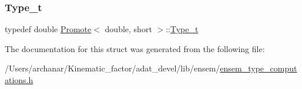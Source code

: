 \subsubsection{\texorpdfstring{Type\_t}{Type\_t}\hspace{0.1cm}{\footnotesize\ttfamily [2/2]}}
{\footnotesize\ttfamily typedef double \mbox{\hyperlink{structPromote}{Promote}}$<$ double, short $>$\+::\mbox{\hyperlink{structPromote_3_01double_00_01short_01_4_a14e4d674ead4648aefc2f0cee3552301}{Type\+\_\+t}}}



The documentation for this struct was generated from the following file\+:\begin{DoxyCompactItemize}
\item 
/\+Users/archanar/\+Kinematic\+\_\+factor/adat\+\_\+devel/lib/ensem/\mbox{\hyperlink{lib_2ensem_2ensem__type__computations_8h}{ensem\+\_\+type\+\_\+computations.\+h}}\end{DoxyCompactItemize}
